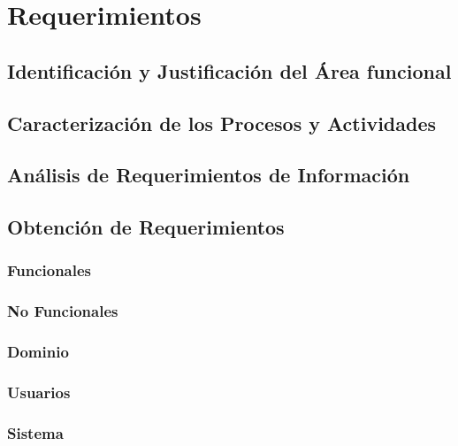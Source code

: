 \chapter{Requerimientos}
\section{Identificaci\'on y Justificaci\'on del \'Area funcional}

\section{Caracterizaci\'on de los Procesos y Actividades}

\section{An\'alisis de Requerimientos de Informaci\'on}

\section{Obtenci\'on de Requerimientos}
\subsection{Funcionales}

\subsection{No Funcionales}

\subsection{Dominio}

\subsection{Usuarios}

\subsection{Sistema}